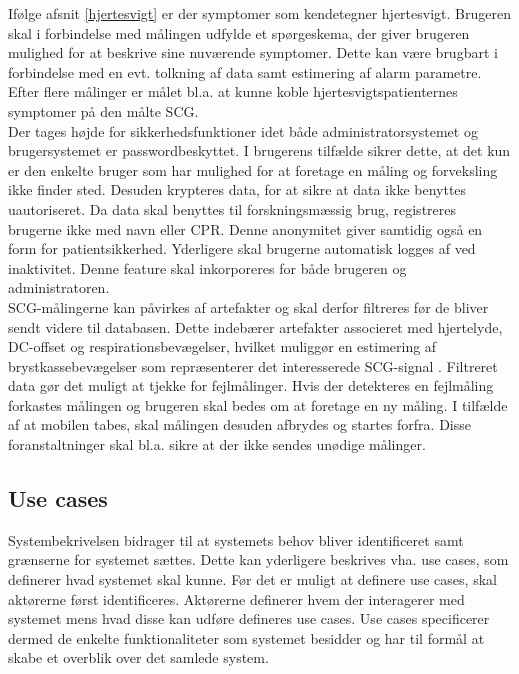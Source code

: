 Ifølge afsnit \ref{hjertesvigt} er der symptomer som kendetegner hjertesvigt. Brugeren skal i forbindelse med målingen udfylde et spørgeskema, der giver brugeren mulighed for at beskrive sine nuværende symptomer. Dette kan være brugbart i forbindelse med en evt. tolkning af data samt estimering af alarm parametre. Efter flere målinger er målet bl.a. at kunne koble hjertesvigtspatienternes symptomer på den målte SCG.\\
Der tages højde for sikkerhedsfunktioner idet både administratorsystemet og brugersystemet er passwordbeskyttet. I brugerens tilfælde sikrer dette, at det kun er den enkelte bruger som har mulighed for at foretage en måling og forveksling ikke finder sted. Desuden krypteres data, for at sikre at data ikke benyttes uautoriseret. Da data skal benyttes til forskningsmæssig brug, registreres brugerne ikke med navn eller CPR. Denne anonymitet giver samtidig også en form for patientsikkerhed. Yderligere skal brugerne automatisk logges af ved inaktivitet. Denne feature skal inkorporeres for både brugeren og administratoren. \\
SCG-målingerne kan påvirkes af artefakter og skal derfor filtreres før de bliver sendt videre til databasen. Dette indebærer artefakter associeret med hjertelyde, DC-offset og respirationsbevægelser, hvilket muliggør en estimering af brystkassebevægelser som repræsenterer det interesserede SCG-signal \citep{Wick2014}. Filtreret data gør det muligt at tjekke for fejlmålinger. Hvis der detekteres en fejlmåling forkastes målingen og brugeren skal bedes om at foretage en ny måling. I tilfælde af at mobilen tabes, skal målingen desuden afbrydes og startes forfra. Disse foranstaltninger skal bl.a. sikre at der ikke sendes unødige målinger.

\subsection{Use cases}

Systembekrivelsen bidrager til at systemets behov bliver identificeret samt grænserne for systemet sættes. Dette kan yderligere beskrives vha. use cases, som definerer hvad systemet skal kunne. Før det er muligt at definere use cases, skal aktørerne først identificeres. Aktørerne definerer hvem der interagerer med systemet mens hvad disse kan udføre defineres use cases. Use cases specificerer dermed de enkelte funktionaliteter som systemet besidder og har til formål at skabe et overblik over det samlede system.

